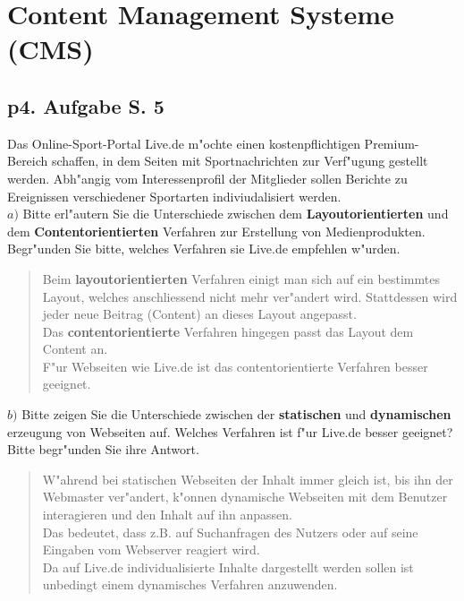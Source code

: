 \section{Content Management Systeme (CMS)}

\subsection{p4. Aufgabe S. 5}
Das Online-Sport-Portal Live.de m"ochte einen kostenpflichtigen Premium-Bereich schaffen, in dem Seiten mit Sportnachrichten zur Verf"ugung gestellt werden.
Abh"angig vom Interessenprofil der Mitglieder sollen Berichte zu Ereignissen verschiedener Sportarten indiviudalisiert werden.\\

\noindent
$a)$ Bitte erl"autern Sie die Unterschiede zwischen dem \textbf{Layoutorientierten} und dem \textbf{Contentorientierten} Verfahren zur Erstellung von Medienprodukten.
Begr"unden Sie bitte, welches Verfahren sie Live.de empfehlen w"urden.\\

\begin{quote}
    Beim \textbf{layoutorientierten} Verfahren einigt man sich auf ein bestimmtes Layout, welches anschliessend nicht mehr ver"andert wird.
    Stattdessen wird jeder neue Beitrag (Content) an dieses Layout angepasst.\\
    Das \textbf{contentorientierte} Verfahren hingegen passt das Layout dem Content an.\\

    \noindent
    F"ur Webseiten wie Live.de ist das contentorientierte Verfahren besser geeignet.
\end{quote}




\noindent
$b)$ Bitte zeigen Sie die Unterschiede zwischen der \textbf{statischen} und \textbf{dynamischen} erzeugung von Webseiten auf.
Welches Verfahren ist f"ur Live.de besser geeignet?
Bitte begr"unden Sie ihre Antwort.\\
\begin{quote}
    W"ahrend bei statischen Webseiten der Inhalt immer gleich ist, bis ihn der Webmaster ver"andert, k"onnen dynamische Webseiten  mit dem Benutzer interagieren und den Inhalt auf ihn anpassen.\\
    Das bedeutet, dass z.B. auf Suchanfragen des Nutzers oder auf seine Eingaben vom Webserver reagiert wird.\\

    \noindent
    Da auf Live.de individualisierte Inhalte dargestellt werden sollen ist unbedingt einem dynamisches Verfahren anzuwenden.
\end{quote}



